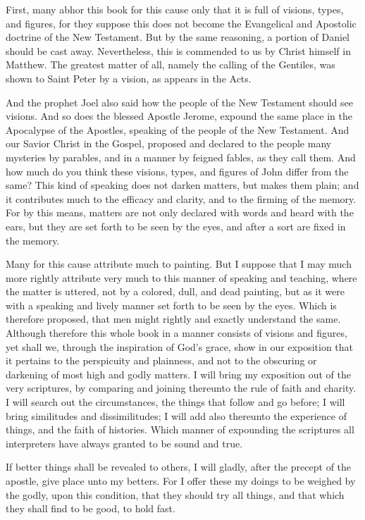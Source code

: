 First, many abhor this book for this cause only that it is full of visions, types, and figures, for they suppose this does not become the Evangelical and Apostolic doctrine of the New Testament. But by the same reasoning, a portion of Daniel should be cast away. Nevertheless, this is commended to us by Christ himself in Matthew. The greatest matter of all, namely the calling of the Gentiles, was shown to Saint Peter by a vision, as appears in the Acts.

And the prophet Joel also said how the people of the New Testament should see visions. And so does the blessed Apostle Jerome, expound the same place in the Apocalypse of the Apostles, speaking of the people of the New Testament. And our Savior Christ in the Gospel, proposed and declared to the people many mysteries by parables, and in a manner by feigned fables, as they call them. And how much do you think these visions, types, and figures of John differ from the same? This kind of speaking does not darken matters, but makes them plain; and it contributes much to the efficacy and clarity, and to the firming of the memory. For by this means, matters are not only declared with words and heard with the ears, but they are set forth to be seen by the eyes, and after a sort are fixed in the memory.

Many for this cause attribute much to painting. But I suppose that I may much more rightly attribute very much to this manner of speaking and teaching, where the matter is uttered, not by a colored, dull, and dead painting, but as it were with a speaking and lively manner set forth to be seen by the eyes. Which is therefore proposed, that men might rightly and exactly understand the same. Although therefore this whole book in a manner consists of visions and figures, yet shall we, through the inspiration of God’s grace, show in our exposition that it pertains to the perspicuity and plainness, and not to the obscuring or darkening of most high and godly matters. I will bring my exposition out of the very scriptures, by comparing and joining thereunto the rule of faith and charity. I will search out the circumstances, the things that follow and go before; I will bring similitudes and dissimilitudes; I will add also thereunto the experience of things, and the faith of histories. Which manner of expounding the scriptures all interpreters have always granted to be sound and true.

If better things shall be revealed to others, I will gladly, after the precept of the apostle, give place unto my betters. For I offer these my doings to be weighed by the godly, upon this condition, that they should try all things, and that which they shall find to be good, to hold fast.

